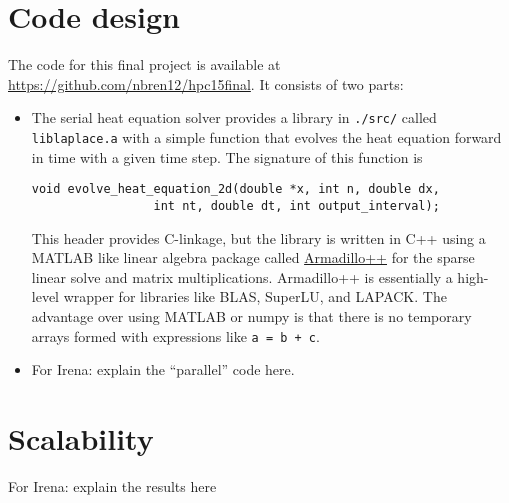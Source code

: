 \documentclass{article}
\begin{document}
\section{Code design}
\label{sec:code}

The code for this final project is available at \url{https://github.com/nbren12/hpc15final}.
It consists of two parts:
\begin{itemize}
\item The serial heat equation solver provides a library in
  \verb|./src/| called \verb|liblaplace.a| with a simple function that
  evolves the heat equation forward in time with a given time
  step. The signature of this function is
\begin{lstlisting}
void evolve_heat_equation_2d(double *x, int n, double dx,
			     int nt, double dt, int output_interval);
\end{lstlisting}
  
This header provides C-linkage, but the library is written in C++
using a MATLAB like linear algebra package called
\href{http://arma.sourceforge.net/}{Armadillo++} for the sparse linear
solve and matrix multiplications. Armadillo++ is essentially a
high-level wrapper for libraries like BLAS, SuperLU, and LAPACK. The
advantage over using MATLAB or numpy is that there is no temporary
arrays formed with expressions like \verb|a = b + c|.

\item For Irena: explain the ``parallel'' code here.

\end{itemize}

\section{Scalability}
\label{sec:scale}

For Irena: explain the results here




\end{document}
